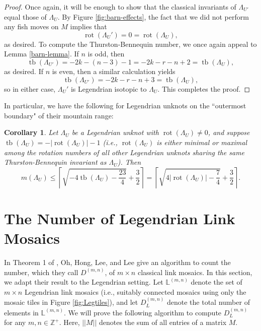 \documentclass{article}
\DeclareMathOperator{\tb}{tb}
\DeclareMathOperator{\rot}{rot}
\newcommand{\Z}{\mathbb{Z}}
\newtheorem{cor}{Corollary}
\begin{document}
\begin{proof}
    Once again, it will be enough to show that the classical invariants of $\Lambda_{U'}$ equal those of $\Lambda_{U}$.
    By Figure \ref{fig:barn-effects}, the fact that we did not perform any fish moves on $M$ implies that 
    \[
    \rot({\Lambda_U'})=0=\rot({\Lambda_U}),
    \]
    as desired.
    To compute the Thurston-Bennequin number, we once again appeal to Lemma \ref{barn-lemma}. If $n$ is odd, then
    \[
    \tb({\Lambda_{U'}}) = -2k-(n-3)-1 = -2k-r-n+2= \tb({\Lambda_U}),
    \]
    as desired. If $n$ is even, then a similar calculation yields
    \[
    \tb({\Lambda_{U'}}) = -2k-r-n+3 = \tb({\Lambda_U}),
    \]
    so in either case, ${\Lambda_U'}$ is Legendrian isotopic to ${\Lambda_U}$. This completes the proof.
\end{proof}

In particular, we have the following for Legendrian unknots on the ``outermost boundary" of their mountain range:

\begin{cor}\label{cor:fishbound}
    Let $\Lambda_U$ be a Legendrian unknot with $\rot(\Lambda_U)\neq 0$, and suppose $\tb(\Lambda_U)=-|\rot(\Lambda_U)|-1$ (i.e., $\rot(\Lambda_U)$ is either minimal or maximal among the rotation numbers of all other Legendrian unknots sharing the same Thurston-Bennequin invariant as $\Lambda_U$). Then
    \begin{equation} \label{improved-fish-ladder}
        m(\Lambda_U)\leq \left\lceil \sqrt{-4\tb(\Lambda_U)-\frac{23}{4}} + \frac{3}{2} \right\rceil = \left\lceil \sqrt{4|\rot(\Lambda_U)|-\frac{7}{4}} + \frac{3}{2} \right\rceil.
    \end{equation}
\end{cor}

\section{The Number of Legendrian Link Mosaics} \label{sec:counting}
In Theorem 1 of \cite{mosaic-count}, Oh, Hong, Lee, and Lee give an algorithm to count the number, which they call $D^{(m,n)}$, of $m\times n$ classical link mosaics. In this section, we adapt their result to the Legendrian setting. Let $\mathbb{L}^{(m,n)}$ denote the set of $m\times n$ Legendrian link mosaics (i.e., suitably connected mosaics using only the mosaic tiles in Figure \ref{fig:Legtiles}), and let $D_L^{(m,n)}$ denote the total number of elements in $\mathbb{L}^{(m,n)}$. 
We will prove the following algorithm to compute $D_L^{(m,n)}$ for any $m,n\in\Z^+$. Here, $||M||$ denotes the sum of all entries of a matrix $M$.
\end{document}
